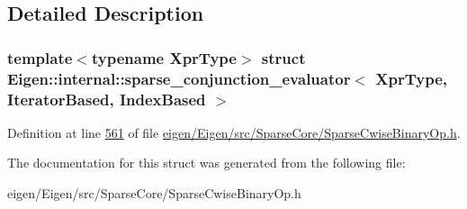 \subsection{Detailed Description}
\subsubsection*{template$<$typename Xpr\+Type$>$\newline
struct Eigen\+::internal\+::sparse\+\_\+conjunction\+\_\+evaluator$<$ Xpr\+Type, Iterator\+Based, Index\+Based $>$}



Definition at line \hyperlink{eigen_2_eigen_2src_2_sparse_core_2_sparse_cwise_binary_op_8h_source_l00561}{561} of file \hyperlink{eigen_2_eigen_2src_2_sparse_core_2_sparse_cwise_binary_op_8h_source}{eigen/\+Eigen/src/\+Sparse\+Core/\+Sparse\+Cwise\+Binary\+Op.\+h}.



The documentation for this struct was generated from the following file\+:\begin{DoxyCompactItemize}
\item 
eigen/\+Eigen/src/\+Sparse\+Core/\+Sparse\+Cwise\+Binary\+Op.\+h\end{DoxyCompactItemize}
